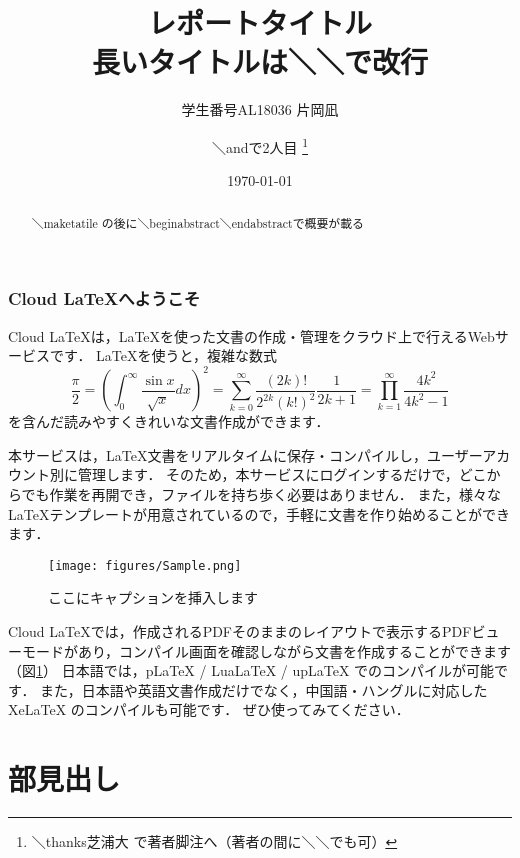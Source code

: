 \documentclass[a4paper,12pt,papersize,twocolumn,titlepage]{jsarticle}
\title{レポートタイトル　\\ 長いタイトルは＼＼で改行}
\author{学生番号AL18036 片岡凪 \and ＼andで2人目 \thanks{＼thanks芝浦大 で著者脚注へ（著者の間に＼＼でも可）}}
\date{\today}
\begin{document}
\maketitle

\setcounter{tocdepth}{2}
\tableofcontents

\begin{abstract}
  ＼maketatile の後に＼begin{abstract}＼end{abstract}で概要が載る
\end{abstract}


\section{Cloud LaTeXへようこそ}

Cloud LaTeXは，\LaTeX を使った文書の作成・管理をクラウド上で行えるWebサービスです．
\LaTeX を使うと，複雑な数式
\begin{equation}
  \frac{\pi}{2} =
  \left( \int_{0}^{\infty} \frac{\sin x}{\sqrt{x}} dx \right)^2 =
  \sum_{k=0}^{\infty} \frac{(2k)!}{2^{2k}(k!)^2} \frac{1}{2k+1} =
  \prod_{k=1}^{\infty} \frac{4k^2}{4k^2 - 1}
\end{equation}
を含んだ読みやすくきれいな文書作成ができます．

\newpage

本サービスは，\LaTeX 文書をリアルタイムに保存・コンパイルし，ユーザーアカウント別に管理します．
そのため，本サービスにログインするだけで，どこからでも作業を再開でき，ファイルを持ち歩く必要はありません．
また，様々な \LaTeX テンプレートが用意されているので，手軽に文書を作り始めることができます．

\begin{figure}
  \centering
  \texttt{[image: figures/Sample.png]}
  \caption{ここにキャプションを挿入します}
  \label{fig:model}
\end{figure}

\noindent
Cloud LaTeXでは，作成されるPDFそのままのレイアウトで表示するPDFビューモードがあり，コンパイル画面を確認しながら文書を作成することができます（図\ref{fig:model}）
日本語では，pLaTeX / LuaLaTeX / upLaTeX でのコンパイルが可能です．
また，日本語や英語文書作成だけでなく，中国語・ハングルに対応した XeLaTeX のコンパイルも可能です．
ぜひ使ってみてください．

\part{部見出し}
\end{document}
